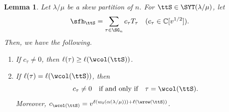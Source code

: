 \documentclass[12pt, reqno]{amsart}
\theoremstyle{plain}
\newtheorem{lemma}[lemma]{Lemma}
\theoremstyle{definition}
\numberwithin{equation}{section}
\numberwithin{figure}{section}
\numberwithin{table}{section}
\def\C{\mathbb C}
\begin{document}
\begin{lemma}\label{lem: triangularity of elt in  B}
Let $\lambda/\mu$ be a skew partition of $n$.
For $\ttS \in \SYT(\lambda/\mu)$, 
let 
\[
\sfh_{\ttS} = \sum_{\tau \in \SG_n} c_\tau T_\tau \quad\text{$(c_\tau \in \C[v^{1/2}])$}.
\]
Then, we have the following.
\begin{enumerate}[label = {\rm (\arabic*)}]
    \item If $c_\tau \neq 0$, then $\ell(\tau) \geq \ell(\wcol(\ttS))$.
    \item If $\ell(\tau) = \ell(\wcol(\ttS))$, then 
    \[
c_\tau \neq 0    \quad\text{if and only if}\quad \tau = \wcol(\ttS).
    \]
Moreover,  $c_{\wcol(\ttS)} = v^{\ell(w_0(\alpha(\lambda/\mu))) + \ell(\wrow(\ttS))}$.
\end{enumerate}
\end{lemma}
\end{document}
